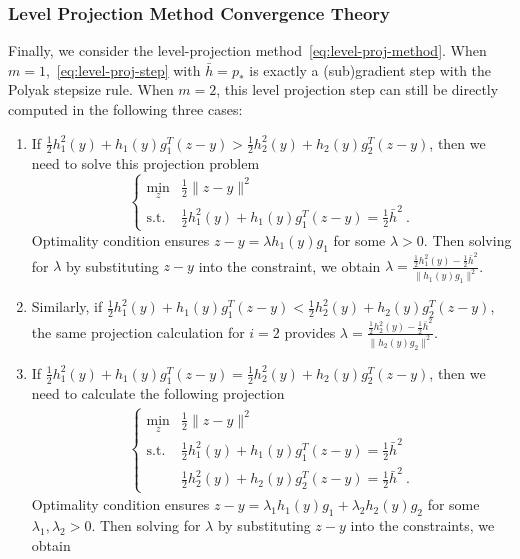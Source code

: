 \documentclass[sn-mathphys,Numbered]{sn-jnl}%
\begin{document}
\begin{appendices}
{\subsubsection{Level Projection Method Convergence Theory}
Finally, we consider the level-projection method~\eqref{eq:level-proj-method}.
When $m=1$,~\eqref{eq:level-proj-step} with $\bar h=p_*$ is exactly a (sub)gradient step with the Polyak stepsize rule. When $m=2$, this level projection step can still be directly computed in the following three cases:
\begin{enumerate}
    \item[(a)] If $\frac{1}{2}h^2_1(y) + h_1(y)g_{1}^T(z-y) > \frac{1}{2}h^2_2(y) + h_2(y)g_{2}^T(z-y)$, then we need to solve this projection problem
    \begin{equation*}
    \begin{cases}
        \min_z& \frac{1}{2}\|z-y\|^2\\
        \mathrm{s.t.} & \frac{1}{2}h^2_1(y) + h_1(y)g_{1}^T(z-y) = \frac{1}{2}\bar h^2 \ .
    \end{cases}
    \end{equation*}
    Optimality condition ensures $z-y=\lambda h_1(y)g_1$ for some $\lambda>0$. Then solving for $\lambda$ by substituting $z-y$ into the constraint, we obtain $\lambda= \frac{\frac{1}{2}h^2_1(y) - \frac{1}{2}\bar h^2}{\|h_1(y)g_{1}\|^2}$.
    \item[(b)] Similarly, if $\frac{1}{2}h^2_1(y) + h_1(y)g_{1}^T(z-y) < \frac{1}{2}h^2_2(y) + h_2(y)g_{2}^T(z-y)$, the same projection calculation for $i=2$ provides $\lambda= \frac{\frac{1}{2}h^2_2(y) - \frac{1}{2}\bar h^2}{\|h_2(y)g_{2}\|^2}$.
    \item[(c)] If $\frac{1}{2}h^2_1(y) + h_1(y)g_{1}^T(z-y) = \frac{1}{2}h^2_2(y) + h_2(y)g_{2}^T(z-y)$, then we need to calculate the following projection 
     \begin{align*}
    \begin{cases}
        \min_z& \frac{1}{2}\|z-y\|^2\\
        \mathrm{s.t.} & \frac{1}{2}h^2_1(y) + h_1(y)g_{1}^T(z-y) = \frac{1}{2}\bar h^2  \\
        &\frac{1}{2}h^2_2(y) + h_2(y)g_{2}^T(z-y) = \frac{1}{2}\bar h^2 \ . 
    \end{cases}
    \end{align*}
    Optimality condition ensures $z-y=\lambda_1 h_1(y)g_1+\lambda_2 h_2(y)g_2$ for some $\lambda_1, \lambda_2>0$. Then solving for $\lambda$ by substituting $z-y$ into the constraints, we obtain 

\end{enumerate}}
\end{appendices}
\end{document}
